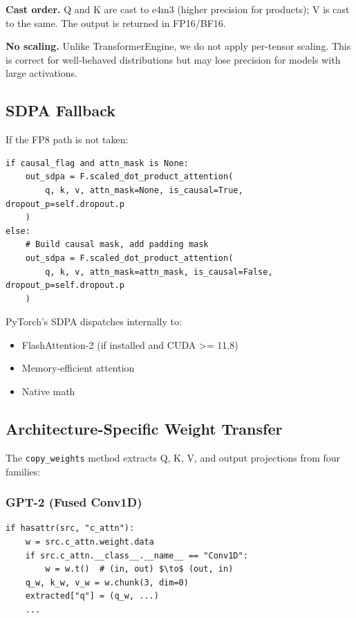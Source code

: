 \textbf{Cast order.} Q and K are cast to e4m3 (higher precision for products); 
V is cast to the same. The output is returned in FP16/BF16.

\textbf{No scaling.} Unlike TransformerEngine, we do not apply per-tensor scaling. 
This is correct for well-behaved distributions but may lose precision for 
models with large activations.

\subsection{SDPA Fallback}

If the FP8 path is not taken:

\begin{lstlisting}
if causal_flag and attn_mask is None:
    out_sdpa = F.scaled_dot_product_attention(
        q, k, v, attn_mask=None, is_causal=True, dropout_p=self.dropout.p
    )
else:
    # Build causal mask, add padding mask
    out_sdpa = F.scaled_dot_product_attention(
        q, k, v, attn_mask=attn_mask, is_causal=False, dropout_p=self.dropout.p
    )
\end{lstlisting}

PyTorch's SDPA dispatches internally to:
\begin{itemize}
\item FlashAttention-2 (if installed and CUDA >= 11.8)
\item Memory-efficient attention
\item Native math

\end{itemize}
\subsection{Architecture-Specific Weight Transfer}

The \texttt{copy\_weights} method extracts Q, K, V, and output projections from four 
families:

\subsubsection{GPT-2 (Fused Conv1D)}

\begin{lstlisting}
if hasattr(src, "c_attn"):
    w = src.c_attn.weight.data
    if src.c_attn.__class__.__name__ == "Conv1D":
        w = w.t()  # (in, out) $\to$ (out, in)
    q_w, k_w, v_w = w.chunk(3, dim=0)
    extracted["q"] = (q_w, ...)
    ...
\end{lstlisting}

